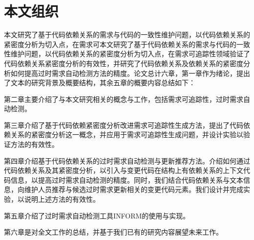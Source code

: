 \section{本文组织}
本文研究了基于代码依赖关系的需求与代码的一致性维护问题，以代码依赖关系的紧密度分析为切入点，在需求可本文研究了基于代码依赖关系的需求与代码的一致性维护问题，以代码依赖关系的紧密度分析为切入点，在需求可追踪性领域验证了代码依赖关系紧密度分析的有效性，并研究了代码依赖关系及依赖关系的紧密度分析如何提高过时需求自动检测方法的精度。论文总计六章，第一章作为绪论，提出了文本的研究背景及概要结构，其余五章的概要内容总结如下：

第二章主要介绍了与本文研究相关的概念与工作，包括需求可追踪性，过时需求自动检测。

第三章介绍了基于代码依赖紧密度分析改进需求可追踪性生成方法，提出了代码依赖关系的紧密度分析这一概念，并应用于需求可追踪性生成问题，并设计实验以验证方法的有效性。

第四章介绍基于代码依赖关系的过时需求自动检测与更新推荐方法。介绍如何通过代码依赖关系及其紧密度分析，以引入与变更代码在结构上有依赖关系的上下文代码信息，以提高过时需求自动检测的精度。同时，我们结合代码依赖关系与文本信息，向维护人员推荐与候选过时需求更新相关的变更代码元素。我们设计并完成实验，以说明上述方法的有效性。

第五章介绍了过时需求自动检测工具INFORM的使用与实现。

第六章是对全文工作的总结，并基于我们已有的研究内容展望未来工作。